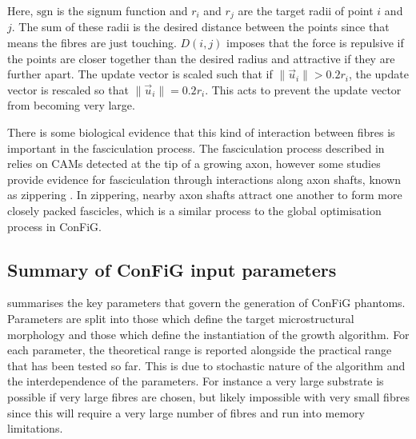 Here, $\mathrm{sgn}$ is the signum function and $r_i$ and $r_j$ are the target radii of point $i$ and $j$. The sum of these radii is the desired distance between the points since that means the fibres are just touching. $D(i,j)$ imposes that the force is repulsive if the points are closer together than the desired radius and attractive if they are further apart. The update vector is scaled such that if $\|\vec{u}_i\| > 0.2r_i$, the update vector is rescaled so that $\|\vec{u}_i\|=0.2r_i$. This acts to prevent the update vector from becoming very large.

There is some biological evidence that this kind of interaction between fibres is important in the fasciculation process. The fasciculation process described in  relies on CAMs detected at the tip of a growing axon, however some studies provide evidence for fasciculation through interactions along axon shafts, known as zippering \cite{Barry2010,Smit2017,Voyiadjis2011}. In zippering, nearby axon shafts attract one another to form more closely packed fascicles, which is a similar process to the global optimisation process in ConFiG.

\subsection{Summary of ConFiG input parameters}
\label{sec:config_summary_of_input}
 summarises the key parameters that govern the generation of ConFiG phantoms. Parameters are split into those which define the target microstructural morphology and those which define the instantiation of the growth algorithm. For each parameter, the theoretical range is reported alongside the practical range that has been tested so far. This is due to stochastic nature of the algorithm and the interdependence of the parameters. For instance a very large substrate is possible if very large fibres are chosen, but likely impossible with very small fibres since this will require a very large number of fibres and run into memory limitations.

